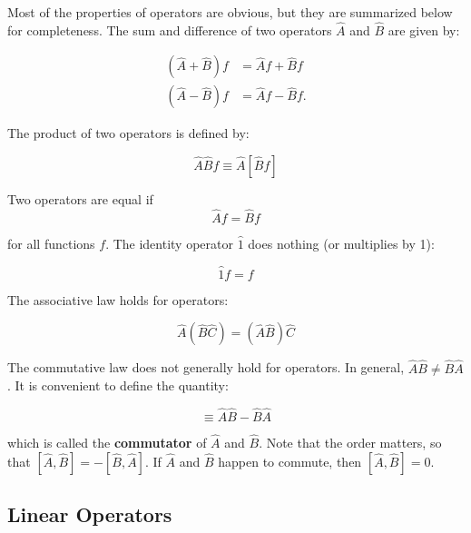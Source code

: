 \documentclass[
  9pt,
]{extbook}
\theoremstyle{definition}
\theoremstyle{definition}
\theoremstyle{definition}
\theoremstyle{remark}
\begin{document}
Most of the properties of operators are obvious, but they are summarized below for completeness.
The sum and difference of two operators \(\hat{A}\) and \(\hat{B}\) are given by:

\begin{equation}
\begin{aligned}
 (\hat{A} + \hat{B}) f &= \hat{A} f + \hat{B} f \\
(\hat{A} - \hat{B}) f &= \hat{A} f - \hat{B} f.
\end{aligned}
\label{eq:bp0}
\end{equation}

The product of two operators is defined by:

\begin{equation}
\hat{A} \hat{B} f \equiv \hat{A} [ \hat{B} f ]
\label{eq:bp1}
\end{equation}

Two operators are equal if
\begin{equation}
\hat{A} f = \hat{B} f
\label{eq:bp2}
\end{equation}

for all functions \(f\). The identity operator \(\hat{1}\) does nothing (or multiplies by 1):

\begin{equation}
{\hat 1} f = f
\label{eq:bp3}
\end{equation}

The associative law holds for operators:

\begin{equation}
\hat{A}(\hat{B}\hat{C}) = (\hat{A}\hat{B})\hat{C}
\label{eq:bp4}
\end{equation}

The commutative law does not generally hold for operators. In general, \(\hat{A} \hat{B} \neq \hat{B} \hat{A}\). It is convenient to define the quantity:

\begin{equation}
[\hat{A}, \hat{B}]\equiv \hat{A} \hat{B} - \hat{B} \hat{A}
\label{eq:bp5}
\end{equation}

which is called the \textbf{commutator} of \(\hat{A}\) and \(\hat{B}\). Note that the order matters, so that \([ \hat{A}, \hat{B}] = - [ \hat{B}, \hat{A}]\). If \(\hat{A}\) and \(\hat{B}\) happen to commute, then \([\hat{A}, \hat{B}] = 0\).

\hypertarget{linear-operators}{%
\subsection{Linear Operators}\label{linear-operators}}
\end{document}
